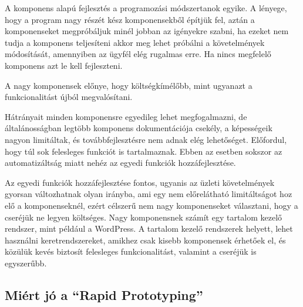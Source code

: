 \documentclass[a4paper,12pt,oneside]{report}
\begin{document}
\begin{justify}
	A komponens alapú fejlesztés a programozási módszertanok egyike. A lényege, hogy a program nagy részét kész komponensekből építjük fel, aztán a komponenseket megpróbáljuk minél jobban az igényekre szabni, ha ezeket nem tudja a komponens teljesíteni akkor meg lehet próbálni a követelmények módosítását, amennyiben az ügyfél elég rugalmas erre. Ha nincs megfelelő komponens azt le kell fejleszteni. \cite{website:component_based_development}

	A nagy komponensek előnye, hogy költségkímélőbb, mint ugyanazt a funkcionalitást újból megvalósítani.

	Hátrányait minden komponensre egyedileg lehet megfogalmazni, de általánosságban legtöbb komponens dokumentációja csekély, a képességeik nagyon limitáltak, és továbbfejlesztésre nem adnak elég lehetőséget. Előfordul, hogy túl sok felesleges funkciót is tartalmaznak. Ebben az esetben sokszor az automatizáltság miatt nehéz az egyedi funkciók hozzáfejlesztése.

	Az egyedi funkciók hozzáfejlesztése fontos, ugyanis az üzleti követelmények gyorsan változhatnak olyan irányba, ami egy nem előrelátható limitáltságot hoz elő a komponenseknél, ezért célszerű nem nagy komponenseket választani, hogy a cseréjük ne legyen költséges. Nagy komponensnek számít egy tartalom kezelő rendszer, mint például a WordPress. A tartalom kezelő rendszerek helyett, lehet használni keretrendszereket, amikhez csak kisebb komponensek érhetőek el, és közülük kevés biztosít felesleges funkcionalitást, valamint a cseréjük is egyszerűbb. \cite{website:cms_or_fw}

\end{justify}

\newpage
\subsection{Miért jó a “Rapid Prototyping”}
\end{document}
